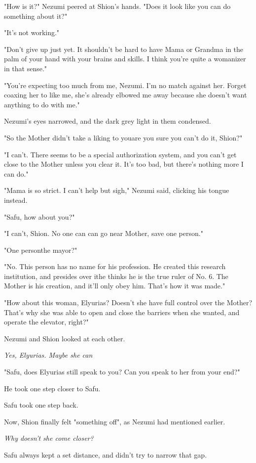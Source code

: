 "How is it?" Nezumi peered at Shion's hands. "Does it look like you can
do something about it?"

"It's not working."

"Don't give up just yet. It shouldn't be hard to have Mama or Grandma in
the palm of your hand with your brains and skills. I think you're quite
a womanizer in that sense."

"You're expecting too much from me, Nezumi. I'm no match against her.
Forget coaxing her to like me, she's already elbowed me away because she
doesn't want anything to do with me."

Nezumi's eyes narrowed, and the dark grey light in them condensed.

"So the Mother didn't take a liking to you\el are you sure you can't do
it, Shion?"

"I can't. There seems to be a special authorization system, and you
can't get close to the Mother unless you clear it. It's too bad, but\el 
there's nothing more I can do."

"Mama is so strict. I can't help but sigh," Nezumi said, clicking his
tongue instead.

"Safu, how about you?"

"I can't, Shion. No one can can go near Mother, save one person."

"One person\el the mayor?"

"No. This person has no name for his profession. He created this
research institution, and presides over it\el he thinks he is the true
ruler of No. 6. The Mother is his creation, and it'll only obey him.
That's how it was made."

"How about this woman, Elyurias? Doesn't she have full control over the
Mother? That's why she was able to open and close the barriers when she
wanted, and operate the elevator, right?"

Nezumi and Shion looked at each other.

\emph{Yes, Elyurias. Maybe she can\el }

"Safu, does Elyurias still speak to you? Can you speak to her from your
end?"

He took one step closer to Safu.

Safu took one step back.

Now, Shion finally felt "something off", as Nezumi had mentioned
earlier.

\emph{Why doesn't she come closer?}

Safu always kept a set distance, and didn't try to narrow that gap.

